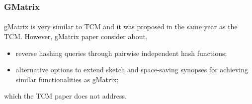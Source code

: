 \subsubsection{GMatrix\cite{khan_query-friendly_2016}}

\paragraph{}
gMatrix is very similar to TCM and it was proposed in the same year as the TCM. However, gMatrix paper consider about,

\begin{itemize}
    \item reverse hashing queries through pairwise independent hash functions;
    \item alternative options to extend sketch and space-saving synopses for achieving similar functionalities as gMatrix;
\end{itemize}

which the TCM paper does not address.